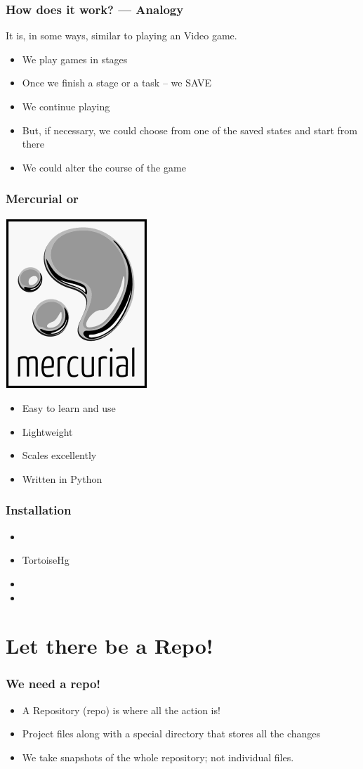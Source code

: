 \documentclass[14pt,compress]{beamer}
\begin{document}
\begin{frame}[fragile]
  \frametitle{How does it work? --- Analogy}
  It is, in some ways, similar to playing an Video game.
  \begin{itemize}
  \item We play games in stages
  \item Once we finish a stage or a task -- \alert{we SAVE}
  \item We continue playing
  \item But, if necessary, we could choose from one of the saved
    states and start from there
  \item We could alter the course of the game
  \end{itemize}
\end{frame}


\begin{frame}
  \frametitle{Mercurial or }
  \begin{center}
    \includegraphics[height=.75in,interpolate=true]{images/mercurial_logo}
  \end{center}
  \begin{itemize}
  \item Easy to learn and use
  \item Lightweight
  \item Scales excellently
  \item Written in Python
  \end{itemize}
\end{frame}

\begin{frame}
  \frametitle{Installation}
  \begin{itemize}
  \item {}
  \item TortoiseHg
  \item {}
  \item {}
  \end{itemize}
\end{frame}

\section{Let there be a Repo!}
\begin{frame}
  \frametitle{We need a repo!}
  \begin{itemize}
  \item A Repository (repo) is where all the action is!
  \item Project files along with a special directory that stores all the
    changes
  \item We take snapshots of the whole repository; not individual
    files. 
  \end{itemize}
\end{frame}
\end{document}
